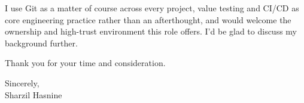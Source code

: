 \documentclass[letterpaper,11pt]{article}
\begin{document}
I use Git as a matter of course across every project, value testing and CI/CD as core engineering practice rather than an afterthought, and would welcome the ownership and high-trust environment this role offers. I'd be glad to discuss my background further.

Thank you for your time and consideration.

\vspace{10pt}

Sincerely, \\
Sharzil Hasnine
\end{document}
